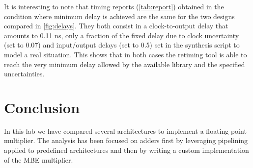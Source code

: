 It is interesting to note that timing reports (\autoref{tab:report}) obtained in the condition where minimum delay is achieved are the same for the two designs compared in \autoref{fig:delays}. They both consist in a clock-to-output delay that amounts to 0.11 ns, only a fraction of the fixed delay due to clock uncertainty (set to 0.07) and input/output delays (set to 0.5) set in the synthesis script to model a real situation. This shows that in both cases the retiming tool is able to reach the very minimum delay allowed by the available library and the specified uncertainties.

\section{Conclusion}
In this lab we have compared several architectures to implement a floating point multiplier. The analysis has been focused on adders first by leveraging pipelining applied to predefined architectures and then by writing a custom implementation of the MBE multiplier. 
